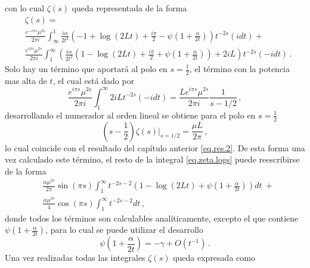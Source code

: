 con lo cual $\zeta (s)$ queda representada de la forma
\begin{align}\label{eq.zeta.logs}
     & \zeta  (s) = \\
     & \frac{e^{-i \pi s} \mu ^{2s}}{2 \pi i} \int _{\infty} ^{1}
     \frac{ i \alpha}{2 t^2}
     \left(
     - 1 +  \log (2 L t) + \frac{i \pi}{2}  - \psi \left( 1+\frac{\alpha}{2 t} \right)
     \right)
     t^{-2 s}
      \nonumber
     (i dt) + \\
     & \frac{e^{i \pi s} \mu ^{2s}}{2 \pi i} \int _1 ^{\infty}
	\left(      
     \frac{ i \alpha}{2  t^2}
     \left(
     1 -  \log (2 L t) + \frac{i \pi}{2} + \psi \left( 1 + \frac{\alpha}{2 t} \right)       
     \right)
     + 2 i L
     \right)
     t^{-2 s}
     (-i dt) \nonumber
     	\, .
\end{align}
Solo hay un término que aportará al polo en $s= \frac{1}{2}$, el término con la potencia mas alta de $t$, el cual está dado por
\begin{equation}
    \frac{e^{i \pi s} \mu ^{2s} }{2 \pi i }
    \int _1 ^{\infty}
    2 i L    
    t ^{-2 s}
    (-i dt) =  
    \frac{L e^{i \pi s} \mu ^{2s}}{2 \pi i} \frac{1}{s-1/2   }
    	\, ,
\end{equation}
desarrollando el numerador al orden lineal se obtiene para el polo en $s= \frac{1}{2}$ 
\begin{equation}
	\left(s- \frac{1}{2} \right)
    \zeta (s) \Big| _{s=1/2} = \frac{\mu L }{2 \pi} 
    	\, ,
\end{equation}
lo cual coincide con el resultado del capítulo anterior \eqref{eq.res.2}.
De esta forma una vez calculado este término, el resto de la integral \eqref{eq.zeta.logs} puede reescribirse de la forma
\begin{align}
    & \frac{\alpha \mu ^{2s} }{2 \pi} \sin(\pi s)
    \int _1 ^{\infty}
    t ^{-2 s-2} 
    \left(
    1 -  \log (2Lt) + \psi \left( 1 + \frac{\alpha}{2t} \right)
    \right) dt \ + 
    	\nonumber \\[5pt]
    &
    \frac{\alpha \mu ^{2s} }{4} 
    \cos (\pi s)
    \int _1 ^{\infty} t^{-2s-2} dt
    	\, ,
\end{align}
donde todos los términos son calculables analíticamente, excepto el que contiene $\psi \left( 1 + \frac{\alpha}{2t} \right)$, para lo cual se puede utilizar el desarrollo
\begin{equation}
    \psi \left(1 + \frac{\alpha}{2 t} \right) =
    - \gamma + O \left( t^{-1} \right)
    \, .
\end{equation}
Una vez realizadas todas las integrales $\zeta (s)$ queda expresada como  
